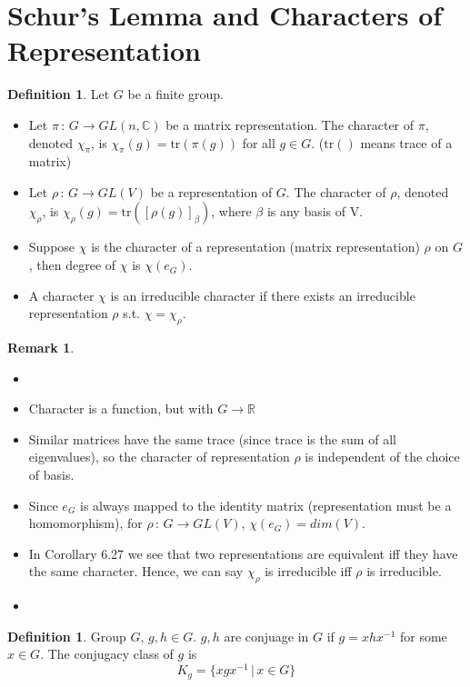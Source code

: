 \documentclass{book}
\newcommand{\R}{\mathbb{R}}
\newcommand{\C}{\mathbb{C}}
\newcommand{\tr}[1]{\textrm{tr}( #1 )}
\theoremstyle{definition}
\newtheorem{definition}[lemma]{Definition}
\theoremstyle{remarkstyle}
\newtheorem*{remark}{Remark}%
\begin{document}
\section{Schur's Lemma and Characters of Representation}
\begin{definition}
    Let $G$ be a finite group. 
    \begin{itemize}
        \item Let $\pi\,:\,G\rightarrow GL(n,\C)$ be a matrix representation. The character of $\pi$, denoted $\chi_\pi$, is $\chi_\pi(g)=\tr{\pi(g)}$ for all $g\in G$. ($\tr{}$ means trace of a matrix)
        \item Let $\rho\,:\,G\rightarrow GL(V)$ be a representation of $G$. The character of $\rho$, denoted $\chi_\rho$, is $\chi_\rho(g) = \tr{[\rho(g)]_\beta}$, where $\beta$ is any basis of V. 
        \item Suppose $\chi$ is the character of a representation (matrix representation) $\rho$ on $G$, then degree of $\chi$ is $\chi(e_G)$. 
        \item A character $\chi$ is an irreducible character if there exists an irreducible representation $\rho$ s.t. $\chi=\chi_\rho$.
    \end{itemize}
\end{definition}
\begin{remark}
    \begin{itemize}
        \item[] 
        \item Character is a function, but with $G\rightarrow \R$
        \item Similar matrices have the same trace (since trace is the sum of all eigenvalues), so the character of representation $\rho$ is independent of the choice of basis.
        \item Since $e_G$ is always mapped to the identity matrix (representation must be a homomorphism), for $\rho\,:\,G\rightarrow GL(V)$, $\chi(e_G) = dim(V) $. 
        \item In Corollary 6.27 we see that two representations are equivalent iff they have the same character. Hence, we can say $\chi_\rho$ is irreducible iff $\rho$ is irreducible.
        \item[] 
    \end{itemize}
\end{remark}

\begin{definition}
    Group $G$, $g,h\in G$. $g,h$ are conjuage in $G$ if $g=xhx^{-1} $ for some $x\in G$. The conjugacy class of $g$ is 
    $$
    K_g = \{xgx^{-1}\,\lvert\,x\in G\}
    $$
    \newline
\end{definition}
\end{document}
